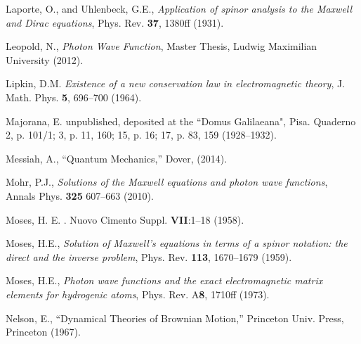 \documentclass[12pt]{article}
\theoremstyle{definition}
\numberwithin{equation}{section}
\begin{document}
\begin{thebibliography}{[KTZ2020]}
  Laporte, O., 
and 
Uhlenbeck, G.E.,
 \textit{Application of spinor analysis to the Maxwell and Dirac equations},
 Phys. Rev. \textbf{37}, 1380ff (1931).\vspace{-4pt}

  Leopold, N.,
  \textit{Photon Wave Function},
  Master Thesis,  Ludwig Maximilian University (2012).\vspace{-4pt}

  Lipkin, D.M.
  \textit{Existence of a new conservation law in electromagnetic theory},
  J. Math. Phys. \textbf{5}, 696--700 (1964).\vspace{-4pt}

Majorana, E.
\newblock unpublished, deposited at the ``Domus Galilaeana", Pisa.
\newblock Quaderno 2, p. 101/1; 3, p. 11, 160; 15, p. 16; 17, p. 83, 159 (1928--1932).\vspace{-4pt}

  Messiah, A.,
  ``Quantum Mechanics,'' Dover, (2014). \vspace{-4pt}

  Mohr, P.J.,
      \textit{Solutions of the Maxwell equations and photon wave functions},
  Annals Phys. \textbf{325} 607--663 (2010). \vspace{-4pt}

Moses, H. E.
.
\newblock Nuovo Cimento Suppl. {\bf VII}:1--18 (1958).\vspace{-4pt}

  Moses, H.E.,
  \textit{Solution of Maxwell's equations in terms of a spinor notation: the direct and the inverse problem},
  Phys. Rev. \textbf{113}, 1670--1679 (1959).\vspace{-4pt}

  Moses, H.E.,
  \textit{Photon wave functions and the exact electromagnetic matrix elements for hydrogenic atoms}, 
  Phys. Rev. A\textbf{8}, 1710ff (1973).\vspace{-4pt}

        Nelson, E.,
                ``{Dynamical Theories of Brownian Motion},''
        Princeton Univ. Press, Princeton (1967).\vspace{-4pt}


\end{thebibliography}
\end{document}
